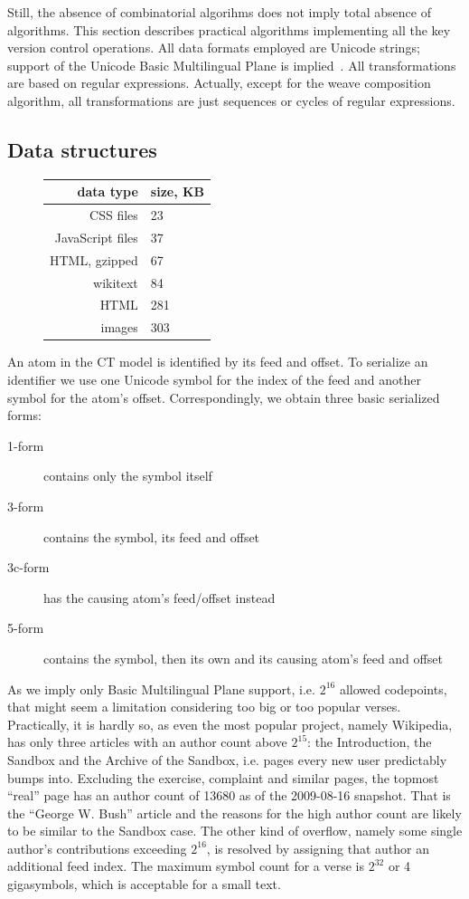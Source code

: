 \documentclass[twocolumn]{article}
\begin{document}
Still, the absence of combinatorial algorihms does not imply total absence of algorithms. This section describes practical algorithms implementing all the key version control operations.
All data formats employed are Unicode strings; support of the Unicode Basic Multilingual Plane is implied~\cite{unicode}. All transformations are based on regular expressions. Actually, except for the weave composition algorithm, all transformations are just sequences or cycles of regular expressions.

\subsection{Data structures}
\begin{figure}
\begin{tabular}{r|l}
data type & size, KB \\
\hline
CSS files & 23 \\
JavaScript files & 37 \\
HTML, gzipped & 67 \\
wikitext & 84 \\
HTML & 281 \\
images & 303 
\end{tabular}
\end{figure}
An atom in the CT model is identified by its feed and offset. To serialize an identifier we use one Unicode symbol for the index of the feed and another symbol for the atom's offset.
Correspondingly, we obtain three basic serialized forms:
\begin{description}
\item[1-form] contains only the symbol itself
\item[3-form] contains the symbol, its feed and offset
\item[3c-form] has the causing atom's feed/offset instead
\item[5-form] contains the symbol, then its own and its causing atom's feed and offset
\end{description}
As we imply only Basic Multilingual Plane support, i.e. $2^{16}$ allowed codepoints, that might seem a limitation considering too big or too popular verses. Practically, it is hardly so, as even the most popular project, namely Wikipedia, has only three articles with an author count above $2^{15}$: the Introduction, the Sandbox and the Archive of the Sandbox, i.e. pages every new user predictably bumps into. Excluding the exercise, complaint and similar pages, the topmost ``real'' page has an author count of 13680 as of the 2009-08-16 snapshot. That is the ``George W. Bush'' article and the reasons for the high author count are likely to be similar to the Sandbox case.
The other kind of overflow, namely some single author's contributions exceeding $2^{16}$, is resolved by assigning that author an additional feed index. The maximum symbol count for a verse is $2^{32}$ or 4 gigasymbols, which is acceptable for a small text.
\end{document}
